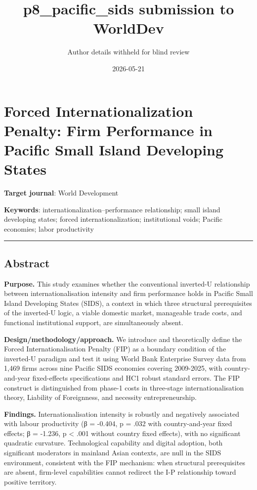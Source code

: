 \documentclass[12pt,a4paper]{article}
\title{p8\_pacific\_sids submission to WorldDev}
\author{Author details withheld for blind review}
\date{2026-05-21}
\begin{document}
\maketitle

\hypertarget{forced-internationalization-penalty-firm-performance-in-pacific-small-island-developing-states}{%
\section{Forced Internationalization Penalty: Firm Performance in
Pacific Small Island Developing
States}\label{forced-internationalization-penalty-firm-performance-in-pacific-small-island-developing-states}}

\textbf{Target journal}: World Development

\textbf{Keywords}: internationalization--performance relationship; small
island developing states; forced internationalization; institutional
voids; Pacific economies; labor productivity

\begin{center}\rule{0.5\linewidth}{0.5pt}\end{center}

\hypertarget{abstract}{%
\subsection{Abstract}\label{abstract}}

\textbf{Purpose.} This study examines whether the conventional
inverted-U relationship between internationalisation intensity and firm
performance holds in Pacific Small Island Developing States (SIDS), a
context in which three structural prerequisites of the inverted-U logic,
a viable domestic market, manageable trade costs, and functional
institutional support, are simultaneously absent.

\textbf{Design/methodology/approach.} We introduce and theoretically
define the Forced Internationalisation Penalty (FIP) as a boundary
condition of the inverted-U paradigm and test it using World Bank
Enterprise Survey data from 1,469 firms across nine Pacific SIDS
economies covering 2009-2025, with country-and-year fixed-effects
specifications and HC1 robust standard errors. The FIP construct is
distinguished from phase-1 costs in three-stage internationalisation
theory, Liability of Foreignness, and necessity entrepreneurship.

\textbf{Findings.} Internationalisation intensity is robustly and
negatively associated with labour productivity (β = -0.404, p = .032
with country-and-year fixed effects; β = -1.236, p \textless{} .001
without country fixed effects), with no significant quadratic curvature.
Technological capability and digital adoption, both significant
moderators in mainland Asian contexts, are null in the SIDS environment,
consistent with the FIP mechanism: when structural prerequisites are
absent, firm-level capabilities cannot redirect the I-P relationship
toward positive territory.
\end{document}
